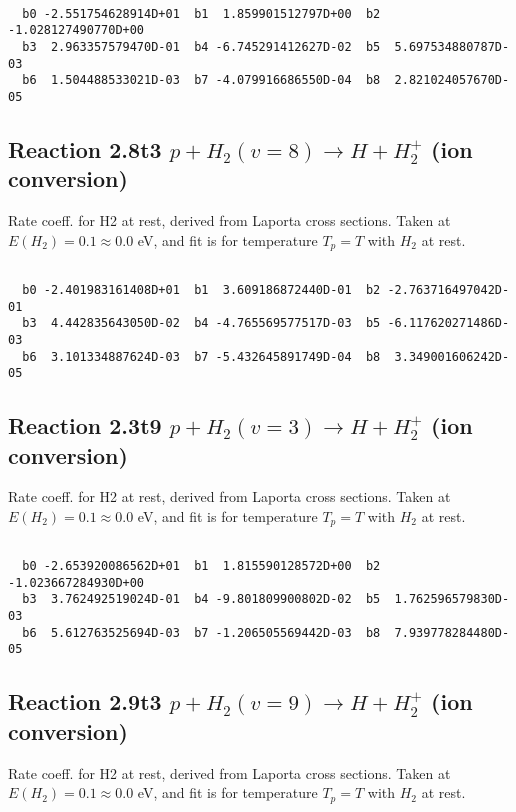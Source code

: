 \begin{small}\begin{verbatim}

  b0 -2.551754628914D+01  b1  1.859901512797D+00  b2 -1.028127490770D+00
  b3  2.963357579470D-01  b4 -6.745291412627D-02  b5  5.697534880787D-03
  b6  1.504488533021D-03  b7 -4.079916686550D-04  b8  2.821024057670D-05

\end{verbatim}\end{small}

\newpage
\subsection{
Reaction 2.8t3
$ p + H_2(v=8) \rightarrow H + H_2^+$ (ion conversion)
}
Rate coeff. for H2 at rest, derived from Laporta cross sections.
Taken at $E(H_2) = 0.1 \approx 0.0$ eV,  and fit is for temperature $T_p=T$ with $H_2$ at rest.

\begin{small}\begin{verbatim}

  b0 -2.401983161408D+01  b1  3.609186872440D-01  b2 -2.763716497042D-01
  b3  4.442835643050D-02  b4 -4.765569577517D-03  b5 -6.117620271486D-03
  b6  3.101334887624D-03  b7 -5.432645891749D-04  b8  3.349001606242D-05

\end{verbatim}\end{small}

\newpage
\subsection{
Reaction 2.3t9
$ p + H_2(v=3) \rightarrow H + H_2^+$ (ion conversion)
}
Rate coeff. for H2 at rest, derived from Laporta cross sections.
Taken at $E(H_2) = 0.1 \approx 0.0$ eV,  and fit is for temperature $T_p=T$ with $H_2$ at rest.

\begin{small}\begin{verbatim}

  b0 -2.653920086562D+01  b1  1.815590128572D+00  b2 -1.023667284930D+00
  b3  3.762492519024D-01  b4 -9.801809900802D-02  b5  1.762596579830D-03
  b6  5.612763525694D-03  b7 -1.206505569442D-03  b8  7.939778284480D-05

\end{verbatim}\end{small}

\newpage
\subsection{
Reaction 2.9t3
$ p + H_2(v=9) \rightarrow H + H_2^+$ (ion conversion)
}
Rate coeff. for H2 at rest, derived from Laporta cross sections.
Taken at $E(H_2) = 0.1 \approx 0.0$ eV,  and fit is for temperature $T_p=T$ with $H_2$ at rest.

